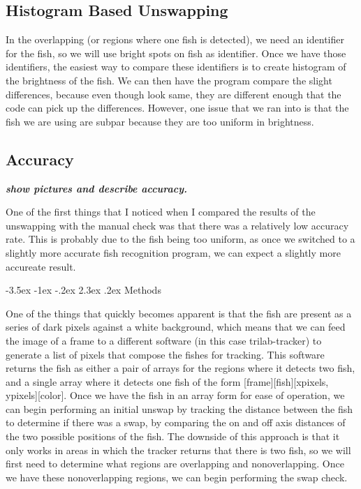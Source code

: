 \documentclass{article}
\makeatletter
\renewcommand\section{\clearpage\newpage\@startsection {section}{1}{\z@}%
	{-3.5ex \@plus -1ex \@minus -.2ex}%
	{2.3ex \@plus.2ex}%
	{\normalfont\Large\bfseries}}
\makeatother
\begin{document}
\subsection{Histogram Based Unswapping}
In the overlapping (or regions where one fish is detected), we need an identifier for the fish, so we will use bright spots on fish as identifier. Once we have those identifiers, the easiest way to compare these identifiers is to create histogram of the brightness of the fish. We can then have the program compare the slight differences, because even though look same, they are different enough that the code can pick up the differences. However, one issue that we ran into is that the fish we are using are subpar because they are too uniform in brightness.

\subsection{Accuracy}
\textbf{\textit{show pictures and describe accuracy.}}

One of the first things that I noticed when I compared the results of the unswapping with the manual check was that there was a relatively low accuracy rate. This is probably due to the fish being too uniform, as once we switched to a slightly more accurate fish recognition program, we can expect a slightly more accureate result.

\section{Methods}

One of the things that quickly becomes apparent is that the fish are present as a series of dark pixels against a white background, which means that we can feed the image of a frame to a different software (in this case trilab-tracker) to generate a list of pixels that compose the fishes for tracking. This software returns the fish as either a pair of arrays for the regions where it detects two fish, and a single array where it detects one fish of the form [frame][fish][xpixels, ypixels][color]. Once we have the fish in an array form for ease of operation, we can begin performing an initial unswap by tracking the distance between the fish to determine if there was a swap, by comparing the on and off axis distances of the two possible positions of the fish. The downside of this approach is that it only works in areas in which the tracker returns that there is two fish, so we will first need to determine what regions are overlapping and nonoverlapping. Once we have these nonoverlapping regions, we can begin performing the swap check. 
\end{document}
